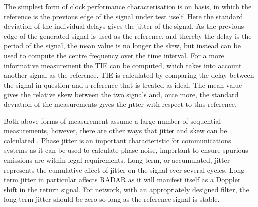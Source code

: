 The simplest form of clock performance characterisation is on  basis, in which the reference is the previous edge of the signal under test itself. Here the standard deviation of the individual delays gives the jitter of the signal. As the previous edge of the generated signal is used as the reference, and thereby the delay is the period of the signal, the mean value is no longer the skew, but instead can be used to compute the centre frequency over the time interval. For a more informative measurement the \ac{TIE} can be computed, which takes into account another signal as the reference. \ac{TIE} is calculated by comparing the delay between the signal in question and a reference that is treated as ideal. The mean value gives the relative skew between the two signals and, once more, the standard deviation of the measurements gives the jitter with respect to this reference.

Both above forms of measurement assume a large number of sequential measurements, however, there are other ways that jitter and skew can be calculated \cite{AN10007}. Phase jitter is an important characteristic for communications systems as it can be used to calculate phase noise, important to ensure spurious emissions are within legal requirements. Long term, or accumulated, jitter represents the cumulative effect of jitter on the signal over several cycles. Long term jitter in particular affects \acs*{RADAR} as it will manifest itself as a Doppler shift in the return signal. For  network, with an appropriately designed filter, the long term jitter should be zero so long as the reference signal is stable. %